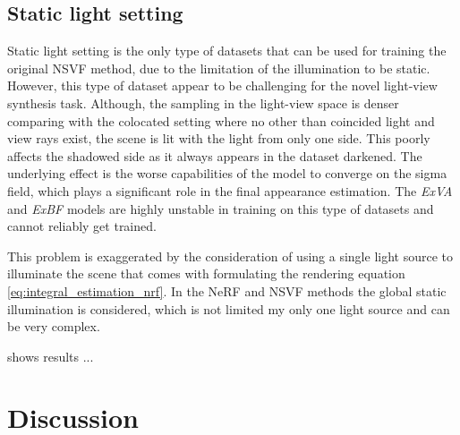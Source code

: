 

% 










\subsection{Static light setting}

Static light setting is the only type of datasets that can be used
for training the original NSVF method,
due to the limitation of the illumination to be static.
However, this type of dataset appear to be challenging for the novel light-view synthesis task.
Although, the sampling in the light-view space is denser comparing with the colocated setting
where no other than coincided light and view rays exist,
the scene is lit with the light from only one side.
This poorly affects the shadowed side as it always appears in the dataset darkened.
The underlying effect is the worse capabilities of the model to converge on the sigma field,
which plays a significant role in the final appearance estimation.
The \textit{ExVA} and \textit{ExBF} models are highly unstable in training on this type of datasets
and cannot reliably get trained.

This problem is exaggerated by the consideration of using a single light source to illuminate the scene
that comes with formulating the rendering equation \cref{eq:integral_estimation_nrf}.
In the NeRF and NSVF methods the global static illumination is considered,
which is not limited my only one light source and can be very complex.

 shows results ...



\section{Discussion}

